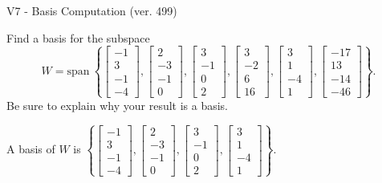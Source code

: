 \begin{exercise}
  \begin{exerciseTitle}V7 - Basis Computation (ver. 499)\end{exerciseTitle}
  \begin{exerciseStatement}
    Find a basis for the subspace 
\[W=\mathrm{span}\ \left\{\left[\begin{array}{r}
-1 \\
3 \\
-1 \\
-4
\end{array}\right] , \left[\begin{array}{r}
2 \\
-3 \\
-1 \\
0
\end{array}\right] , \left[\begin{array}{r}
3 \\
-1 \\
0 \\
2
\end{array}\right] , \left[\begin{array}{r}
3 \\
-2 \\
6 \\
16
\end{array}\right] , \left[\begin{array}{r}
3 \\
1 \\
-4 \\
1
\end{array}\right] , \left[\begin{array}{r}
-17 \\
13 \\
-14 \\
-46
\end{array}\right]\right\}.\]
 Be sure to explain why your result is a basis.


  \end{exerciseStatement}
  \begin{exerciseAnswer}
   A basis of \(W\) is  \(\left\{\left[\begin{array}{r}
-1 \\
3 \\
-1 \\
-4
\end{array}\right] , \left[\begin{array}{r}
2 \\
-3 \\
-1 \\
0
\end{array}\right] , \left[\begin{array}{r}
3 \\
-1 \\
0 \\
2
\end{array}\right] , \left[\begin{array}{r}
3 \\
1 \\
-4 \\
1
\end{array}\right]\right\}\).
  


  \end{exerciseAnswer}
\end{exercise}